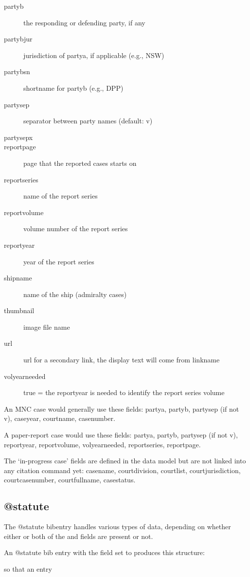 \begin{description}
\item[partyb]the responding or defending party, if any
\item[partybjur]jurisdiction of partya, if applicable (e.g., NSW)
\item[partybsn]shortname for partyb (e.g., DPP)
\item[partysep]separator between party names (default: v)
\item[partysepx]
\item[reportpage]page that the reported cases starts on
\item[reportseries]name of the report series
\item[reportvolume]volume number of the report series
\item[reportyear]year of the report series
\item[shipname]name of the ship (admiralty cases)
\item[thumbnail]image file name
\item[url]url for a secondary link, the display text will come from linkname
\item[volyearneeded]true = the reportyear is needed to identify the report series volume
\end{description}

\p An MNC case would generally use these fields: {\ttfamily
partya, 
partyb, 
partysep (if not v), 
caseyear, 
courtname, 
casenumber}.

\p A paper-report case would use these fields: {\ttfamily
partya, 
partyb, 
partysep (if not v), 
reportyear, 
reportvolume, 
volyearneeded, 
reportseries, 
reportpage}. 

\p The `in-progress case' fields are defined in the data model but are not linked into any citation command yet: {\ttfamily
casename, 
courtdivision, 
courtlist, 
courtjurisdiction, 
courtcasenumber, 
courtfullname, 
casestatus}.

\subsection{@statute}%
\p The @statute bibentry handles various types of data, depending on whether either or both of the  and  fields are present or not.

\p An @statute bib entry with the  field set to  produces this structure:

\begin{quotation}
\end{quotation}
so that an entry

